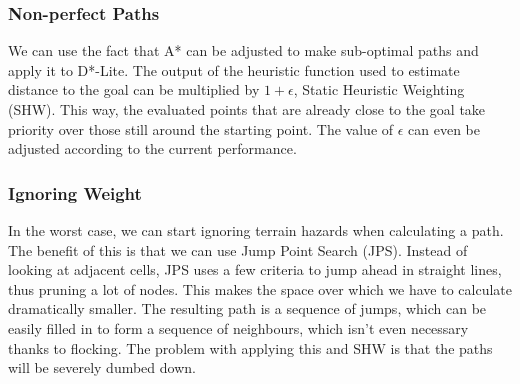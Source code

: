 \subsubsection{Non-perfect Paths}
We can use the fact that A* can be adjusted to make sub-optimal paths and apply it to D*-Lite. The output of the heuristic function used to estimate distance to the goal can be multiplied by $1 + \epsilon$, Static Heuristic Weighting (SHW). This way, the evaluated points that are already close to the goal take priority over those still around the starting point. The value of $\epsilon$ can even be adjusted according to the current performance.

\subsubsection{Ignoring Weight}
In the worst case, we can start ignoring terrain hazards when calculating a path. The benefit of this is that we can use Jump Point Search (JPS). Instead of looking at adjacent cells, JPS uses a few criteria to jump ahead in straight lines, thus pruning a lot of nodes. This makes the space over which we have to calculate dramatically smaller. The resulting path is a sequence of jumps, which can be easily filled in to form a sequence of neighbours, which isn't even necessary thanks to flocking. The problem with applying this and SHW is that the paths will be severely dumbed down.